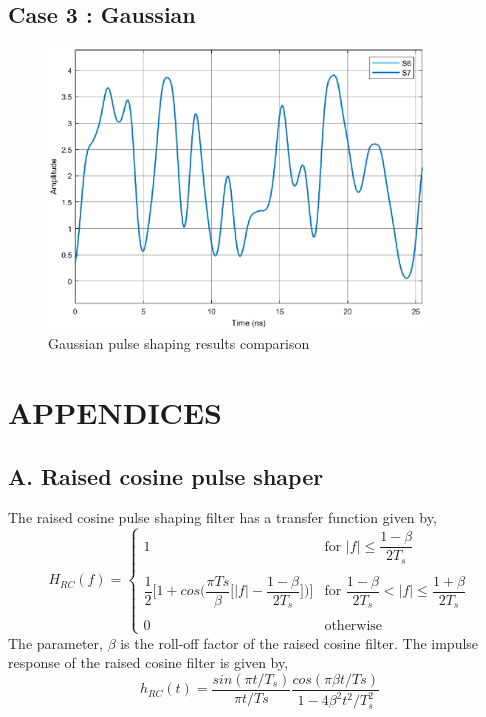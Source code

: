 \begin{refsection}
\subsection*{Case 3 : Gaussian}
\begin{figure}[h]
	\centering
	\includegraphics[width=10cm]{./algorithms/filter/figures/Gaussian_S6S7.eps}
	\caption{Gaussian pulse shaping results comparison}
	\label{S6_S7_gaussian}
\end{figure}

\newpage

\section*{APPENDICES}
\subsection*{A. Raised cosine pulse shaper}
The raised cosine pulse shaping filter has a transfer function given by,
\begin{equation}
H_{RC}(f) = \begin{cases}
1 &\text{for $|f|\leq \dfrac{1-\beta}{2T_s}$}\\ \\
\dfrac{1}{2} \bigg[1 + cos\bigg(\dfrac{\pi Ts}{\beta}\bigg[|f|- \dfrac{1-\beta}{2T_s} \bigg]\bigg)\bigg] &\text{for $\dfrac{1-\beta}{2T_s}<|f|\leq\dfrac{1+\beta}{2T_s}$}\\ \\
0 & \text{otherwise}
\end{cases}
\end{equation}
The parameter, $\beta$ is the roll-off factor of the raised cosine filter. The impulse response of the raised cosine filter is given by,
\begin{equation}
h_{RC}(t) = \dfrac{sin(\pi t/T_s)}{\pi t/Ts}\dfrac{cos(\pi \beta t/Ts)}{1-4 \beta^2 t^2/T_{s}^2 }
\label{hRC}
\end{equation}

\end{refsection}
